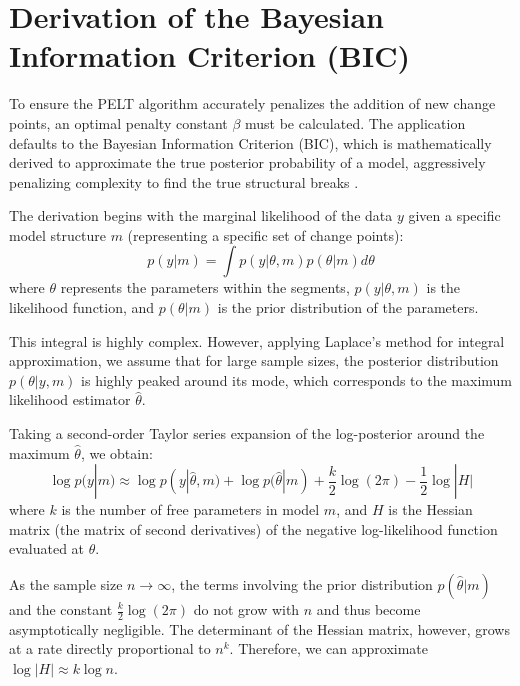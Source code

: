 \section{Derivation of the Bayesian Information Criterion (BIC)}
To ensure the PELT algorithm accurately penalizes the addition of new change points, an optimal penalty constant $\beta$ must be calculated. The application defaults to the Bayesian Information Criterion (BIC), which is mathematically derived to approximate the true posterior probability of a model, aggressively penalizing complexity to find the true structural breaks \cite{Schwarz1978}.

The derivation begins with the marginal likelihood of the data $y$ given a specific model structure $m$ (representing a specific set of change points):
\begin{equation}
    p(y | m) = \int p(y | \theta, m) p(\theta | m) d\theta
\end{equation}
where $\theta$ represents the parameters within the segments, $p(y | \theta, m)$ is the likelihood function, and $p(\theta | m)$ is the prior distribution of the parameters. 

This integral is highly complex. However, applying Laplace's method for integral approximation, we assume that for large sample sizes, the posterior distribution $p(\theta | y, m)$ is highly peaked around its mode, which corresponds to the maximum likelihood estimator $\hat{\theta}$. 

Taking a second-order Taylor series expansion of the log-posterior around the maximum $\hat{\theta}$, we obtain:
\begin{equation}
    \log p(y | m) \approx \log p(y | \hat{\theta}, m) + \log p(\hat{\theta} | m) + \frac{k}{2} \log(2\pi) - \frac{1}{2} \log |H|
\end{equation}
where $k$ is the number of free parameters in model $m$, and $H$ is the Hessian matrix (the matrix of second derivatives) of the negative log-likelihood function evaluated at $\hat{\theta}$. 

As the sample size $n \to \infty$, the terms involving the prior distribution $p(\hat{\theta} | m)$ and the constant $\frac{k}{2} \log(2\pi)$ do not grow with $n$ and thus become asymptotically negligible. The determinant of the Hessian matrix, however, grows at a rate directly proportional to $n^k$. Therefore, we can approximate $\log |H| \approx k \log n$.

